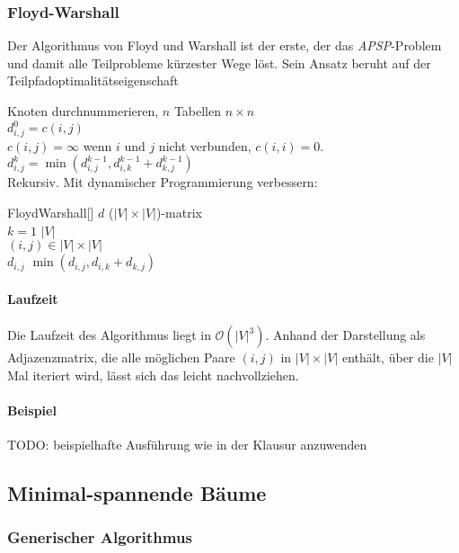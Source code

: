 \subsubsection{Floyd-Warshall}
\label{subsubsec:FloydWarshall}

Der Algorithmus von Floyd und Warshall ist der erste,
der das \textit{APSP}-Problem und damit alle Teilprobleme kürzester Wege löst.
Sein Ansatz beruht auf der Teilpfadoptimalitätseigenschaft

Knoten durchnummerieren, $n$ Tabellen $n \times n$\\
$d_{i,j}^0 = c(i, j)$\\
$c(i, j) = \infty$ wenn $i$ und $j$ nicht verbunden, $c(i, i) = 0$.\\
$d_{i,j}^k = \min (d_{i,j}^{k-1}, d_{i,k}^{k-1} + d_{k,j}^{k-1})$\\
Rekursiv. Mit dynamischer Programmierung verbessern:

\begin{algorithm}{FloydWarshall}[]{
	\qinput{}
	\qoutput{}
}
$d$ \qlet ($|V| \times |V|$)-matrix\\
\qfor $k = 1$ \qto $|V|$\\
	\qfor $(i, j) \in |V| \times |V|$\\
		$d_{i, j}$ \qlet $\min (d_{i, j}, d_{i, k} + d_{k, j})$
	\qrof
\qrof
\end{algorithm}

\paragraph{Laufzeit}
Die Laufzeit des Algorithmus liegt in $\mathcal{O}(|V|^3)$.
Anhand der Darstellung als Adjazenzmatrix, die alle möglichen Paare $(i, j)$ in $|V| \times |V|$ enthält,
über die $|V|$ Mal iteriert wird, lässt sich das leicht nachvollziehen.

\paragraph{Beispiel}
TODO: beispielhafte Ausführung wie in der Klausur anzuwenden

\subsection{Minimal-spannende Bäume}
\label{subsec:MinimalSpannendeBaeume}

\subsubsection{Generischer Algorithmus}

